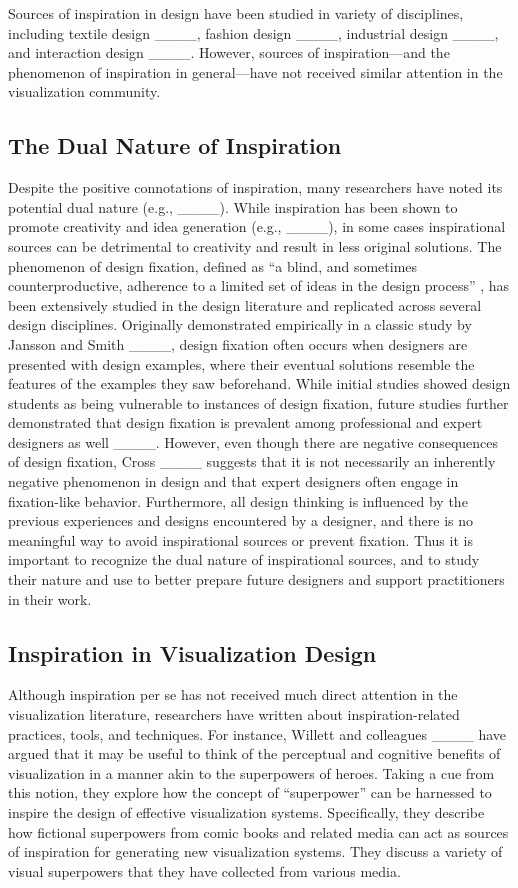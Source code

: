 Sources of inspiration in design have been studied in variety of disciplines, including textile design ____, fashion design ____, industrial design ____, and interaction design ____. However, sources of inspiration---and the phenomenon of inspiration in general---have not received similar attention in the visualization community.

\subsection{The Dual Nature of Inspiration}
\label{sec:dual}
Despite the positive connotations of inspiration, many researchers have noted its potential dual nature (e.g., ____). While inspiration has been shown to promote creativity and idea generation (e.g., ____), in some cases inspirational sources can be detrimental to creativity and result in less original solutions. The phenomenon of design fixation, defined as ``a blind, and sometimes counterproductive, adherence to a limited set of ideas in the design process'' \cite[p. 4]{jansson_design_1991}, has been extensively studied in the design literature and replicated across several design disciplines. Originally demonstrated empirically in a classic study by Jansson and Smith ____, design fixation often occurs when designers are presented with design examples, where their eventual solutions resemble the features of the examples they saw beforehand. While initial studies showed design students as being vulnerable to instances of design fixation, future studies further demonstrated that design fixation is prevalent among professional and expert designers as well ____. However, even though there are negative consequences of design fixation, Cross ____ suggests that it is not necessarily an inherently negative phenomenon in design and that expert designers often engage in fixation-like behavior. Furthermore, all design thinking is influenced by the previous experiences and designs encountered by a designer, and there is no meaningful way to avoid inspirational sources or prevent fixation. Thus it is important to recognize the dual nature of inspirational sources, and to study their nature and use to better prepare future designers and support practitioners in their work.

\subsection{Inspiration in Visualization Design}
Although inspiration per se has not received much direct attention in the visualization literature, researchers have written about inspiration-related practices, tools, and techniques. For instance, Willett and colleagues ____ have argued that it may be useful to think of the perceptual and cognitive benefits of visualization in a manner akin to the superpowers of heroes. Taking a cue from this notion, they explore how the concept of ``superpower'' can be harnessed to inspire the design of effective visualization systems. Specifically, they describe how fictional superpowers from comic books and related media can act as sources of inspiration for generating new visualization systems. They discuss a variety of visual superpowers that they have collected from various media.

